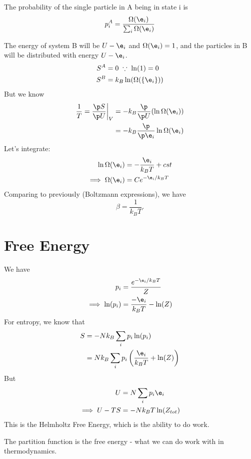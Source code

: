 \documentclass[a4paper, 11pt, normalem]{report}
\begin{document}
The probability of the single particle in A being in state i is
\begin{equation}
    p_i^A = \frac{\Omega(\e_i)}{\sum_i \Omega(\e_i)}
\end{equation}

The energy of system B will be $U - \e_i$ and $\Omega(\e_i) = 1$, and the particles in B will be distributed with energy $U - \e_i$.
\begin{align}
    S^A &= 0 \;\because\; \ln(1) = 0 \\
    S^B &= k_B\ln(\Omega(\{\e_i\}))
\end{align}
But we know
\begin{align}
    \frac{1}{T} = \frac{\p S}{\p U}\bigg|_V &= -k_B\frac{\p}{\p U} (\ln\Omega(\e_i)) \\
                                            &= -k_B\frac{\p}{\p \e_i} \ln\Omega(\e_i)
\end{align}
Let's integrate:
\begin{align}
    \ln\Omega(\e_i) &= -\frac{\e_i}{k_BT} + cst \\
    \implies \Omega(\e_i) &= Ce^{-\e_i/k_BT}
\end{align}
Comparing to previously (Boltzmann expressions), we have
\begin{equation}
    \beta = \frac{1}{k_BT}.
\end{equation}

\section{Free Energy}
We have
\begin{align}
    p_i &= \frac{e^{-\e_i/k_BT}}{Z} \\
    \implies \ln(p_i) &= \frac{-\e_i}{k_BT} - \ln(Z)
\end{align}
For entropy, we know that
\begin{align}
    S &= -Nk_B\sum_i p_i\ln(p_i) \\
      &= Nk_B\sum_ip_i\left(\frac{\e_i}{k_BT} + \ln(Z)\right)
\end{align}
But
\begin{align}
    U &= N\sum_i p_i\e_i \\
    \implies U - TS &= -Nk_BT\ln(Z_{tot})
\end{align}
This is the Helmholtz Free Energy, which is the ability to do work.

The partition function is the free energy - what we can do work with in thermodynamics.
\end{document}
